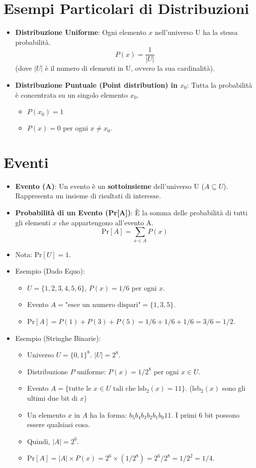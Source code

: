 \section{Esempi Particolari di Distribuzioni}
\begin{itemize}
    \item \textbf{Distribuzione Uniforme}: Ogni elemento $x$ nell'universo U ha la stessa probabilità.
    \[ P(x) = \frac{1}{|U|} \]
    (dove $|U|$ è il numero di elementi in U, ovvero la sua cardinalità).
    \item \textbf{Distribuzione Puntuale (Point distribution) in $x_0$}: Tutta la probabilità è concentrata su un singolo elemento $x_0$.
    \begin{itemize}
        \item $P(x_0) = 1$
        \item $P(x) = 0$ per ogni $x \neq x_0$.
    \end{itemize}
\end{itemize}

\section{Eventi}
\begin{itemize}
    \item \textbf{Evento (A)}: Un evento è un \textbf{sottoinsieme} dell'universo U ($A \subseteq U$). Rappresenta un insieme di risultati di interesse.
    \item \textbf{Probabilità di un Evento (Pr[A])}: È la somma delle probabilità di tutti gli elementi $x$ che appartengono all'evento A.
    \[ \text{Pr}[A] = \sum_{x \in A} P(x) \]
    \item Nota: $\text{Pr}[U] = 1$.
    \item Esempio (Dado Equo):
    \begin{itemize}
        \item $U = \{1, 2, 3, 4, 5, 6\}$, $P(x) = 1/6$ per ogni $x$.
        \item Evento $A = \text{"esce un numero dispari"} = \{1, 3, 5\}$.
        \item $\text{Pr}[A] = P(1) + P(3) + P(5) = 1/6 + 1/6 + 1/6 = 3/6 = 1/2$.
    \end{itemize}
    \item Esempio (Stringhe Binarie):
    \begin{itemize}
        \item Universo $U = \{0,1\}^8$. $|U| = 2^8$.
        \item Distribuzione $P$ uniforme: $P(x) = 1/2^8$ per ogni $x \in U$.
        \item Evento $A = \{ \text{tutte le } x \in U \text{ tali che lsb}_2(x)=11 \}$. (lsb$_2(x)$ sono gli ultimi due bit di $x$)
        \item Un elemento $x$ in $A$ ha la forma: $b_5 b_4 b_3 b_2 b_1 b_0 1 1$. I primi 6 bit possono essere qualsiasi cosa.
        \item Quindi, $|A| = 2^6$.
        \item $\text{Pr}[A] = |A| \times P(x) = 2^6 \times (1/2^8) = 2^6 / 2^8 = 1/2^2 = 1/4$.
    \end{itemize}
\end{itemize}

